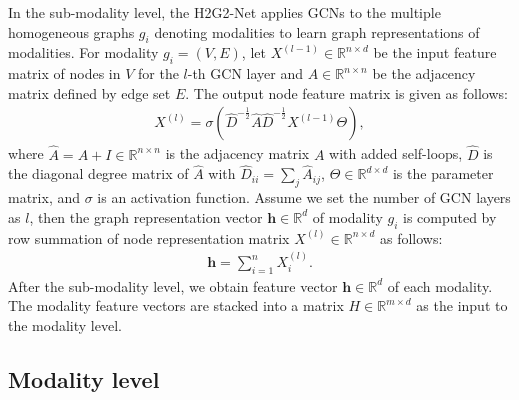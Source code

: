 \documentclass[letterpaper]{article} %
\begin{document}
In the sub-modality level, the H2G2-Net applies GCNs \cite{kipf2016semi} to the multiple homogeneous graphs $g_i$ denoting modalities to learn graph representations of modalities. For modality $g_i=(V, E)$, let $X^{(l-1)}\in\mathbb{R}^{n\times d}$ be the input feature matrix of nodes in $V$ for the $l$-th GCN layer and $A\in\mathbb{R}^{n\times n}$ be the adjacency matrix defined by edge set $E$. The output node feature matrix is given as follows:
\begin{align}
    \label{sub-modality_level}
    X^{(l)} = \sigma \left( \hat{D}^{-\frac{1}{2}} \hat{A} \hat{D}^{-\frac{1}{2}} X^{(l-1)} \Theta \right),
\end{align}
where $\hat{A}=A+I\in\mathbb{R}^{n\times n}$ is the adjacency matrix $A$ with added self-loops, $\hat{D}$ is the diagonal degree matrix of $\hat{A}$ with $\hat{D}_{ii}=\sum_{j} \hat{A}_{i j}$, $\Theta\in\mathbb{R}^{d\times d}$ is the parameter matrix, and $\sigma$ is an activation function. Assume we set the number of GCN layers as $l$, then the graph representation vector $\mathbf{h}\in\mathbb{R}^{d}$ of modality $g_i$ is computed by row summation of node representation matrix $X^{(l)}\in\mathbb{R}^{n\times d}$ as follows:
\begin{align}
    \mathbf{h} = \sum_{i=1}^{n} X_i^{(l)}.
\end{align}
After the sub-modality level, we obtain feature vector $\mathbf{h}\in\mathbb{R}^{d}$ of each modality. The modality feature vectors are stacked into a matrix $H\in\mathbb{R}^{m\times d}$ as the input to the modality level.


\subsection{Modality level}
\end{document}
